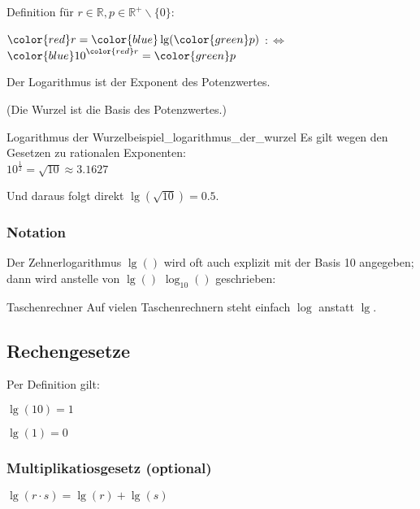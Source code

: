 Definition für $r\in\mathbb{R}, p \in \mathbb{R}^{+}\backslash\{0\}$:
\begin{definition}{}{}
  \begin{center}
    ${\color{red}r} = {\color{blue}\lg}({\color{green}p})$
    $:\Leftrightarrow$
    ${\color{blue}10}^{\color{red}r}={\color{green}p}$
    \end{center}
\end{definition}

Der Logarithmus ist der Exponent des Potenzwertes.

(Die Wurzel ist die Basis des Potenzwertes.)

\begin{beispiel}{Logarithmus der
    Wurzel}{beispiel_logarithmus_der_wurzel}
  Es gilt wegen den Gesetzen zu rationalen Exponenten:\\
$10^{\frac12} = \sqrt{10} \approx 3.1627$

  Und daraus folgt direkt $\lg(\sqrt{10}) = 0.5$.
\end{beispiel}

\subsubsection{Notation}
Der Zehnerlogarithmus $\lg()$ wird oft auch explizit mit der Basis 10
angegeben; dann wird anstelle von $\lg()$ $\log_{10}()$ geschrieben:

\begin{center}
\end{center}

\begin{bemerkung}{Taschenrechner}{}
  Auf vielen Taschenrechnern steht einfach $\log$ anstatt $\lg$.
  \end{bemerkung}
\newpage

\subsection{Rechengesetze}
Per Definition gilt:

\begin{gesetz}{}{}
$\lg(10) = 1$
\end{gesetz}

\begin{gesetz}{}{}
$\lg(1) = 0$
\end{gesetz}

\subsubsection{Multiplikatiosgesetz (optional)}
\begin{gesetz}{}{}
  $\lg(r\cdot s) = \lg(r) + \lg(s)$
\end{gesetz}

